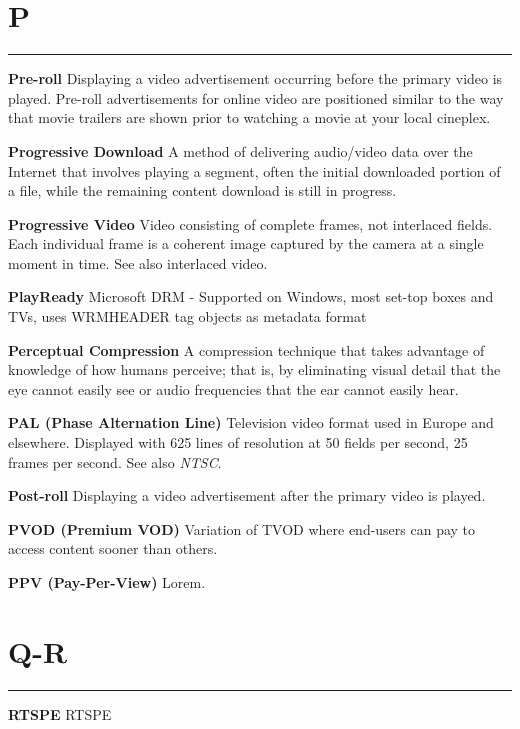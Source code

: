 \section{P}
\hrule



\medskip
\textbf{Pre-roll}
Displaying a video advertisement occurring before the primary video is played. Pre-roll advertisements for online video are positioned similar to the way that movie trailers are shown prior to watching a movie at your local cineplex.


\smallskip
\textbf{Progressive Download}
A method of delivering audio/video data over the Internet that involves playing a segment, often the initial downloaded portion of a file, while the remaining content download is still in progress.

\smallskip
\textbf{Progressive Video}
Video consisting of complete frames, not interlaced fields. Each individual frame is a coherent image captured by the camera at a single moment in time. See also interlaced video.

\smallskip
\textbf{PlayReady}
Microsoft DRM - Supported on Windows, most set-top boxes and TVs, uses WRMHEADER tag objects as metadata format

\smallskip
\textbf{Perceptual Compression}
A compression technique that takes advantage of knowledge of how humans perceive; that is, by eliminating visual detail that the eye cannot easily see or audio frequencies that the ear cannot easily hear.

\smallskip
\textbf{PAL (Phase Alternation Line)}
Television video format used in Europe and elsewhere. Displayed with 625 lines of resolution at 50 fields per second, 25 frames per second. See also \textit{NTSC}.

\smallskip
\textbf{Post-roll}
Displaying a video advertisement after the primary video is played.

\smallskip
\textbf{PVOD (Premium VOD)}
Variation of TVOD where end-users can pay to access content sooner than others.

\smallskip
\textbf{PPV (Pay-Per-View)}
Lorem.


\section{Q-R}
\hrule

\medskip
\textbf{RTSPE}
RTSPE

